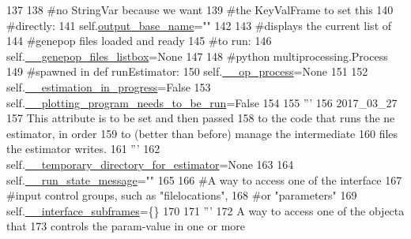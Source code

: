 \begin{DoxyCode}
137 
138         \textcolor{comment}{#no StringVar because we want}
139         \textcolor{comment}{#the KeyValFrame to set this}
140         \textcolor{comment}{#directly:}
141         self.\hyperlink{classnegui_1_1temp_1_1PGGuiNeEstimator_ae81206ca875278e3350b118310eb85f2}{output\_base\_name}=\textcolor{stringliteral}{""}
142 
143         \textcolor{comment}{#displays the current list of}
144         \textcolor{comment}{#genepop files loaded and ready}
145         \textcolor{comment}{#to run:}
146         self.\hyperlink{classnegui_1_1temp_1_1PGGuiNeEstimator_a634afa824020c9e575cec61e9bb174c7}{\_\_genepop\_files\_listbox}=\textcolor{keywordtype}{None}
147 
148         \textcolor{comment}{#python multiprocessing.Process}
149         \textcolor{comment}{#spawned in def runEstimator:}
150         self.\hyperlink{classnegui_1_1temp_1_1PGGuiNeEstimator_a48f5095f58f1b18c94d206b2fb1e0b47}{\_\_op\_process}=\textcolor{keywordtype}{None}
151 
152         self.\hyperlink{classnegui_1_1temp_1_1PGGuiNeEstimator_aa2a3f1e88c6fbc06cb0d936751d872b6}{\_\_estimation\_in\_progress}=\textcolor{keyword}{False}
153         self.\hyperlink{classnegui_1_1temp_1_1PGGuiNeEstimator_a8449ebdfc13612d25d46d40c89801985}{\_\_plotting\_program\_needs\_to\_be\_run}=\textcolor{keyword}{False}
154 
155         \textcolor{stringliteral}{'''}
156 \textcolor{stringliteral}{        2017\_03\_27}
157 \textcolor{stringliteral}{        This attribute is to be set and then passed }
158 \textcolor{stringliteral}{        to the code that runs the ne estimator, in order}
159 \textcolor{stringliteral}{        to (better than before) manage the intermediate}
160 \textcolor{stringliteral}{        files the estimator writes.}
161 \textcolor{stringliteral}{        '''}
162         self.\hyperlink{classnegui_1_1temp_1_1PGGuiNeEstimator_aba47f0ef5cbb9d974844a8f8a85848ed}{\_\_temporary\_directory\_for\_estimator}=\textcolor{keywordtype}{None}
163 
164         self.\hyperlink{classnegui_1_1temp_1_1PGGuiNeEstimator_aed76b9deeff98c844eefe49b238f4ab9}{\_\_run\_state\_message}=\textcolor{stringliteral}{""}
165 
166         \textcolor{comment}{#A way to access one of the interface}
167         \textcolor{comment}{#input control groups, such as "filelocations",}
168         \textcolor{comment}{#or "parameters"}
169         self.\hyperlink{classnegui_1_1temp_1_1PGGuiNeEstimator_a88a4cbe47565349c2105b7e8aadf25ab}{\_\_interface\_subframes}=\{\}
170 
171         \textcolor{stringliteral}{'''}
172 \textcolor{stringliteral}{        A way to access one of the objecta that}
173 \textcolor{stringliteral}{        controls the param-value in one or more }

\end{DoxyCode}
